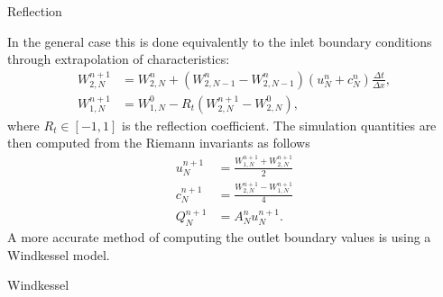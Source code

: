 \documentclass[a4paper, oneside]{discothesis}
\begin{document}
Reflection

In the general case this is done equivalently to the inlet boundary conditions through extrapolation of characteristics:
\begin{align}
	W_{2,N}^{n+1}&=W_{2,N}^n+(W_{2,N-1}^n-W_{2,N-1}^n) (u_N^n+c_N^n) \frac{\Delta t}{\Delta x}, \\
			W_{1,N}^{n+1}&=W_{1,N}^0-R_t (W_{2,N}^{n+1}-W_{2,N}^0),
\end{align}
where $R_t \in [-1,1]$ is the reflection coefficient.
The simulation quantities are then computed from the Riemann invariants as follows
\begin{align}
	u_N^{n+1} &= \frac{W_{1,N}^{n+1} + W_{2,N}^{n+1}}{2} \\
	c_N^{n+1} &= \frac{W_{2,N}^{n+1} - W_{1,N}^{n+1}}{4} \\
	Q_N^{n+1} &= A_N^n u_N^{n+1}.
\end{align}
A more accurate method of computing the outlet boundary values is using a Windkessel model.


Windkessel
\end{document}
